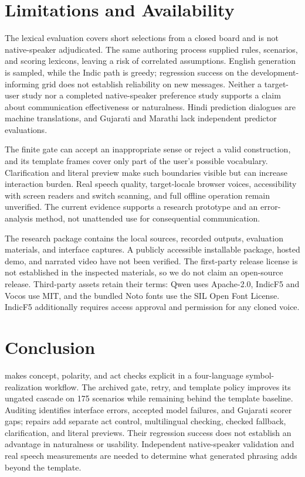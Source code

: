 \section{Limitations and Availability}
\label{sec:limits}
The lexical evaluation covers short selections from a closed board and is not native-speaker adjudicated.
The same authoring process supplied rules, scenarios, and scoring lexicons, leaving a risk of correlated assumptions.
English generation is sampled, while the Indic path is greedy; regression success on the development-informing grid does not establish reliability on new messages.
Neither a target-user study nor a completed native-speaker preference study supports a claim about communication effectiveness or naturalness.
Hindi prediction dialogues are machine translations, and Gujarati and Marathi lack independent predictor evaluations.

The finite gate can accept an inappropriate sense or reject a valid construction, and its template frames cover only part of the user's possible vocabulary.
Clarification and literal preview make such boundaries visible but can increase interaction burden.
Real speech quality, target-locale browser voices, accessibility with screen readers and switch scanning, and full offline operation remain unverified.
The current evidence supports a research prototype and an error-analysis method, not unattended use for consequential communication.

The research package contains the local sources, recorded outputs, evaluation materials, and interface captures.
A publicly accessible installable package, hosted demo, and narrated video have not been verified.
The first-party release license is not established in the inspected materials, so we do not claim an open-source release.
Third-party assets retain their terms: Qwen uses Apache-2.0, IndicF5 and Vocos use MIT, and the bundled Noto fonts use the SIL Open Font License.
IndicF5 additionally requires access approval and permission for any cloned voice.

\section{Conclusion}
\label{sec:conclusion}
\sys{} makes concept, polarity, and act checks explicit in a four-language symbol-realization workflow.
The archived gate, retry, and template policy improves its ungated cascade on 175 scenarios while remaining behind the template baseline.
Auditing identifies interface errors, accepted model failures, and Gujarati scorer gaps; repairs add separate act control, multilingual checking, checked fallback, clarification, and literal previews.
Their regression success does not establish an advantage in naturalness or usability.
Independent native-speaker validation and real speech measurements are needed to determine what generated phrasing adds beyond the template.
